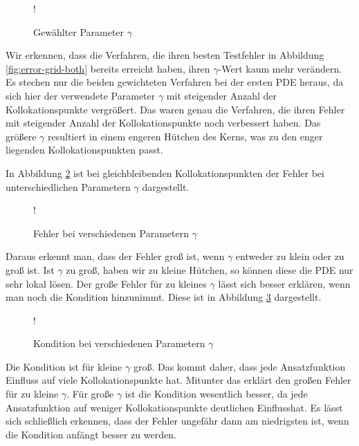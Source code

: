 \begin{figure}[ht]
\centering
\resizebox {\columnwidth} {!} {

}
\caption{Gewählter Parameter $\gamma$}
\label{fig:gamma-grid}
\end{figure}
Wir erkennen, dass die Verfahren, die ihren besten Testfehler in Abbildung \ref{fig:error-grid-both} bereits erreicht haben, ihren $\gamma$-Wert kaum mehr verändern. Es stechen nur die beiden gewichteten Verfahren bei der ersten \ac{PDE} heraus, da sich hier der verwendete Parameter $\gamma$ mit steigender Anzahl der Kollokationspunkte vergrößert. Das waren genau die Verfahren, die ihren Fehler mit steigender Anzahl der Kollokationspunkte noch verbessert haben. Das größere $\gamma$ resultiert in einem engeren \glqq Hütchen\grqq{} des Kerns, was zu den enger liegenden Kollokationspunkten passt.

In Abbildung \ref{fig:gamma-fehler} ist bei gleichbleibenden Kollokationspunkten der Fehler bei unterschiedlichen Parametern $\gamma$ dargestellt.

\begin{figure}[ht]
\centering
\resizebox {\columnwidth} {!} {

}
\caption{Fehler bei verschiedenen Parametern $\gamma$}
\label{fig:gamma-fehler}
\end{figure}

Daraus erkennt man, dass der Fehler groß ist, wenn $\gamma$ entweder zu klein oder zu groß ist. Ist $\gamma$ zu groß, haben wir zu kleine \glqq Hütchen\grqq , so können diese die \ac{PDE} nur sehr lokal lösen. Der große Fehler für zu kleines $\gamma$ lässt sich besser erklären, wenn man noch die Kondition hinzunimmt. Diese ist in Abbildung \ref{fig:kondition} dargestellt.

\begin{figure}[ht]
\centering
\resizebox {\columnwidth} {!} {

}
\caption{Kondition bei verschiedenen Parametern $\gamma$}
\label{fig:kondition}
\end{figure}

Die Kondition ist für kleine $\gamma$ groß. Das kommt daher, dass jede Ansatzfunktion \glqq Einfluss\grqq{}  auf viele Kollokationspunkte hat. Mitunter das erklärt den großen Fehler für zu kleine $\gamma$. Für große $\gamma$ ist die Kondition wesentlich besser, da jede Ansatzfunktion auf weniger Kollokationspunkte deutlichen \glqq Einfluss\grqq  hat. Es lässt sich schließlich erkennen, dass der Fehler ungefähr dann am niedrigsten ist, wenn die Kondition anfängt besser zu werden. 

